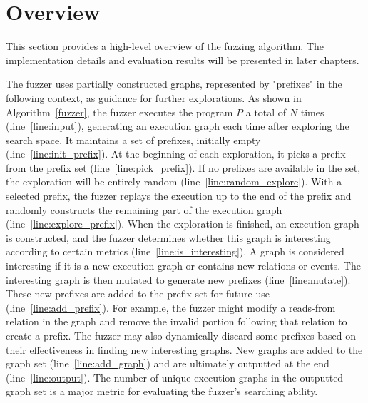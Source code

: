 \section{Overview}



This section provides a high-level overview of the fuzzing algorithm. The implementation details and evaluation results will be presented in later chapters.





The fuzzer uses partially constructed graphs, represented by "prefixes" in the following context, as guidance for further explorations. As shown in Algorithm~\ref{fuzzer}, the fuzzer executes the program $P$ a total of $N$ times (line~\ref{line:input}), generating an execution graph each time after exploring the search space. It maintains a set of prefixes, initially empty (line~\ref{line:init_prefix}). At the beginning of each exploration, it picks a prefix from the prefix set (line~\ref{line:pick_prefix}). If no prefixes are available in the set, the exploration will be entirely random (line~\ref{line:random_explore}). With a selected prefix, the fuzzer replays the execution up to the end of the prefix and randomly constructs the remaining part of the execution graph (line~\ref{line:explore_prefix}). When the exploration is finished, an execution graph is constructed, and the fuzzer determines whether this graph is interesting according to certain metrics (line~\ref{line:is_interesting}). A graph is considered interesting if it is a new execution graph or contains new relations or events. The interesting graph is then mutated to generate new prefixes (line~\ref{line:mutate}). These new prefixes are added to the prefix set for future use (line~\ref{line:add_prefix}). For example, the fuzzer might modify a reads-from relation in the graph and remove the invalid portion following that relation to create a prefix. The fuzzer may also dynamically discard some prefixes based on their effectiveness in finding new interesting graphs. New graphs are added to the graph set (line~\ref{line:add_graph}) and are ultimately outputted at the end (line~\ref{line:output}). The number of unique execution graphs in the outputted graph set is a major metric for evaluating the fuzzer's searching ability.



